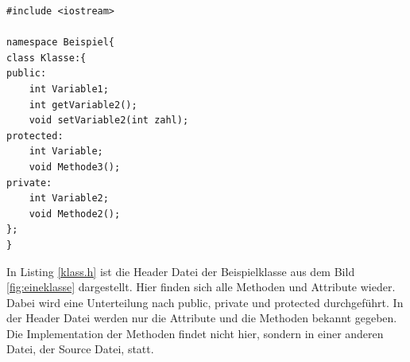 \begin{lstlisting}[caption = Klasse.h,label=klass.h]
#include <iostream>

namespace Beispiel{
class Klasse:{
public:
	int Variable1;
	int getVariable2();
	void setVariable2(int zahl);
protected:
	int Variable;
	void Methode3();
private:
	int Variable2;
	void Methode2();
};
}
\end{lstlisting}
In Listing \ref{klass.h} ist die Header Datei der Beispielklasse aus dem Bild \ref{fig:eineklasse} dargestellt. Hier finden sich alle Methoden und Attribute  wieder. Dabei wird eine Unterteilung nach \glqq public\grqq{},  \glqq private\grqq{} und \glqq protected\grqq{} durchgeführt. In der Header Datei werden nur die Attribute und die Methoden bekannt gegeben. Die Implementation der Methoden findet nicht hier, sondern in einer anderen Datei, der Source Datei, statt.  

